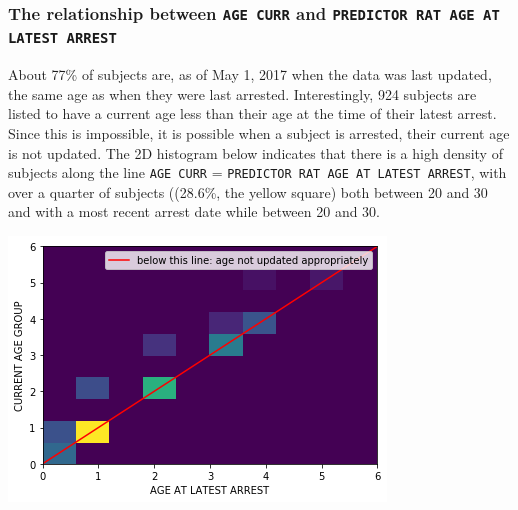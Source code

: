 \subsubsection{The relationship between \texttt{AGE CURR} and \texttt{PREDICTOR RAT AGE AT LATEST ARREST}}
About 77\% of subjects are, as of May 1, 2017 when the data was last updated, the same age as when they were last arrested. Interestingly, 924 subjects are listed to have a current age less than their age at the time of their latest arrest. Since this is impossible, it is possible when a subject is arrested, their current age is not updated. The 2D histogram below indicates that there is a high density of subjects along the line \texttt{AGE CURR} = \texttt{PREDICTOR RAT AGE AT LATEST ARREST}, with over a quarter of subjects ((28.6\%, the yellow square) both between 20 and 30 and with a most recent arrest date while between 20 and 30.
\begin{center}
    \includegraphics[scale=.5]{images/age_at_latest_arrest.png}
\end{center}

